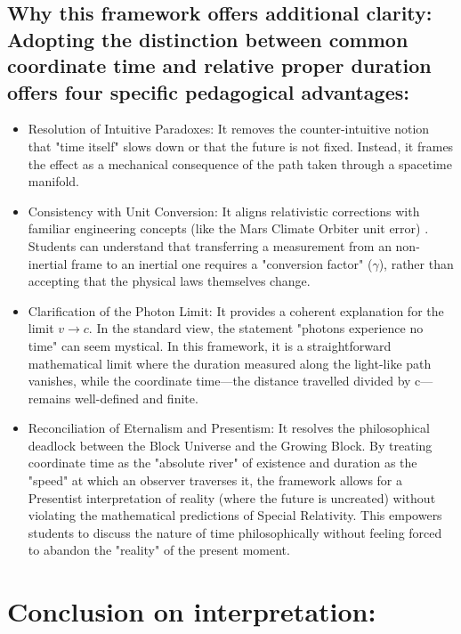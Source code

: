 \documentclass[pdflatex,sn-basic]{sn-jnl}
\theoremstyle{thmstyleone}%
\theoremstyle{thmstyletwo}%
\theoremstyle{thmstylethree}%
\begin{document}
	\subsection{ Why this framework offers additional clarity: Adopting the distinction between common coordinate time and relative proper duration offers four specific pedagogical advantages:}\label{subsec5_3}
		\begin{itemize}
			\item Resolution of Intuitive Paradoxes: It removes the counter-intuitive notion that "time itself" slows down or that the future is not fixed. Instead, it frames the effect as a mechanical consequence of the path taken through a spacetime manifold.
			\item Consistency with Unit Conversion: It aligns relativistic corrections with familiar engineering concepts (like the Mars Climate Orbiter unit error) \cite{nasa1999}. Students can understand that transferring a measurement from an non-inertial frame to an inertial one requires a "conversion factor" ($\gamma$), rather than accepting that the physical laws themselves change.
 			\item Clarification of the Photon Limit: It provides a coherent explanation for the limit $v \to c$. In the standard view, the statement "photons experience no time" can seem mystical. In this framework, it is a straightforward mathematical limit where the duration measured along the light-like path vanishes, while the coordinate time—the distance travelled divided by c—remains well-defined and finite.
 			\item Reconciliation of Eternalism and Presentism: It resolves the philosophical deadlock between the Block Universe and the Growing Block. By treating coordinate time as the "absolute river" of existence and duration as the "speed" at which an observer traverses it, the framework allows for a Presentist interpretation of reality (where the future is uncreated) without violating the mathematical predictions of Special Relativity. This empowers students to discuss the nature of time philosophically without feeling forced to abandon the "reality" of the present moment.
		\end{itemize}
\section{ Conclusion on interpretation:}\label{sec6}
\end{document}
